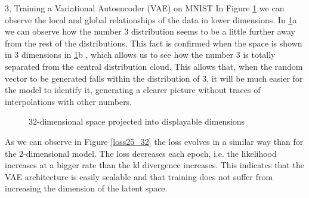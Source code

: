 \begin{task}{3, Training a Variational Autoencoder (VAE) on MNIST}
In Figure \ref{umap32} we can observe the local and global relationships of the data in lower dimensions. In \ref{umap32}a we can observe how the number 3 distribution seems to be a little further away from the rest of the distributions. This fact is confirmed when the space is shown in 3 dimensions in \ref{umap32}b , which allows us to see how the number 3 is totally separated from the central distribution cloud. This allows that, when the random vector to be generated falls within the distribution of 3, it will be much easier for the model to identify it, generating a clearer picture without traces of interpolations with other numbers.

\begin{figure}[H]
    \centering
    \caption{32-dimensional space projected into displayable dimensions}
    \label{umap32}
\end{figure}

As we can observe in Figure \ref{loss25_32} the loss evolves in a similar way than for the 2-dimensional model. The loss decreases each epoch, i.e. the likelihood increases at a bigger rate than the kl divergence increases. This indicates that the VAE architecture is easily scalable and that training does not suffer from increasing the dimension of the latent space.



\end{task}
